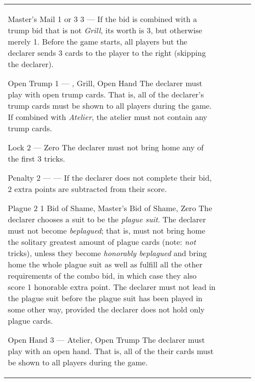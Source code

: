 \begin{center}
\begin{tabularx}{\textwidth}{
				l
				S[table-number-alignment=center, table-format=1.0]
				S[table-number-alignment=center, table-format=1.0]
				p{3cm}
				|X
			}
			\specialBidItem%
			{Master's Mail}
			{{1 or 3}}
			{3}
			{---}
			{%
				If the bid is combined with a trump bid that is not \emph{Grill}, its worth is 3, but otherwise merely 1. Before the game starts, all players but the declarer sends 3 cards to the player to the right (skipping the declarer).
			}

			\specialBidItem%
			{Open Trump}
			{1}
			{{---}}
			{\nonTrump, Grill, Open Hand}
			{%
				The declarer must play with open trump cards. That is, all of the declarer’s trump cards must be shown to all players during the game. If combined with \emph{Atelier}, the atelier must not contain any trump cards.
			}

			\specialBidItem%
			{Lock}
			{2}
			{{---}}
			{Zero}
			{%
				The declarer must not bring home any of the first 3 tricks.
			}

			\specialBidItem%
			{Penalty}
			{2}
			{{---}}
			{---}
			{%
				If the declarer does not complete their bid, 2 extra points are subtracted from their score.
			}

			\specialBidItem%
			{Plague}
			{2}
			{1}
			{Bid of Shame, Master's Bid of Shame, Zero}
			{%
				The declarer chooses a suit to be the \emph{plague suit}. The declarer must not become \emph{beplagued}; that is, must not bring home the solitary greatest amount of plague cards (note: \emph{not} tricks), unless they become \emph{honorably beplagued} and bring home the whole plague suit as well as fulfill all the other requirements of the combo bid, in which case they also score 1 honorable extra point. The declarer must not lead in the plague suit before the plague suit has been played in some other way, provided the declarer does not hold only plague cards.
			}

			\specialBidItem%
			{Open Hand}
			{3}
			{{---}}
			{Atelier, Open Trump}
			{%
				The declarer must play with an open hand. That is, all of the their cards must be shown to all players during the game.
			}
		\end{tabularx}
	\end{center}
